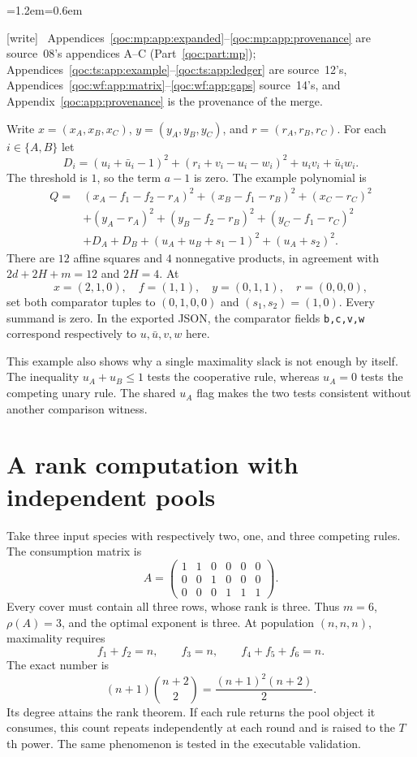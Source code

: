 \documentclass[11pt,letterpaper]{article}
\theoremstyle{definition}
\theoremstyle{remark}
\newcommand{\wtag}{\textup{[write]}}
\newenvironment{writenote}{\par\smallskip\begin{list}{}{\leftmargin=1.2em\rightmargin=0.6em}\item[]\small\wtag\ }{\end{list}\smallskip}
\begin{document}
\begin{writenote}
Appendices~\ref{qoc:mp:app:expanded}--\ref{qoc:mp:app:provenance} are source~08's appendices A--C (Part~\ref{qoc:part:mp}); Appendices~\ref{qoc:ts:app:example}--\ref{qoc:ts:app:ledger} are source~12's, Appendices~\ref{qoc:wf:app:matrix}--\ref{qoc:wf:app:gaps} source~14's, and Appendix~\ref{qoc:app:provenance} is the provenance of the merge.
\end{writenote}
Write $x=(x_A,x_B,x_C)$, $y=(y_A,y_B,y_C)$, and $r=(r_A,r_B,r_C)$.
For each $i\in\{A,B\}$ let
\[
 D_i=(u_i+\bar u_i-1)^2+(r_i+v_i-u_i-w_i)^2+u_iv_i+\bar u_iw_i.
\]
The threshold is $1$, so the term $a-1$ is zero. The example polynomial
is
\begin{align*}
 Q={}&(x_A-f_1-f_2-r_A)^2+(x_B-f_1-r_B)^2+(x_C-r_C)^2\\
 &+(y_A-r_A)^2+(y_B-f_2-r_B)^2+(y_C-f_1-r_C)^2\\
 &+D_A+D_B+(u_A+u_B+s_1-1)^2+(u_A+s_2)^2.
\end{align*}
There are $12$ affine squares and $4$ nonnegative products, in agreement
with $2d+2H+m=12$ and $2H=4$. At
\[
 x=(2,1,0),\quad f=(1,1),\quad y=(0,1,1),\quad r=(0,0,0),
\]
set both comparator tuples to $(0,1,0,0)$ and $(s_1,s_2)=(1,0)$. Every
summand is zero. In the exported JSON, the comparator fields
\texttt{b,c,v,w} correspond respectively to $u,\bar u,v,w$ here.

This example also shows why a single maximality slack is not enough by
itself. The inequality $u_A+u_B\le1$ tests the cooperative rule, whereas
$u_A=0$ tests the competing unary rule. The shared $u_A$ flag makes the two
tests consistent without another comparison witness.

\section{A rank computation with independent pools}\label{qoc:mp:app:rank}
Take three input species with respectively two, one, and three competing
rules. The consumption matrix is
\[
 A=\begin{pmatrix}
 1&1&0&0&0&0\\
 0&0&1&0&0&0\\
 0&0&0&1&1&1
 \end{pmatrix}.
\]
Every cover must contain all three rows, whose rank is three. Thus
$m=6$, $\rho(A)=3$, and the optimal exponent is three. At population
$(n,n,n)$, maximality requires
\[
 f_1+f_2=n,\qquad f_3=n,\qquad f_4+f_5+f_6=n.
\]
The exact number is
\[
 (n+1)\binom{n+2}{2}=\frac{(n+1)^2(n+2)}2.
\]
Its degree attains the rank theorem. If each rule returns the pool object
it consumes, this count repeats independently at each round and is raised
to the $T$th power. The same phenomenon is tested in the executable
validation.
\end{document}
